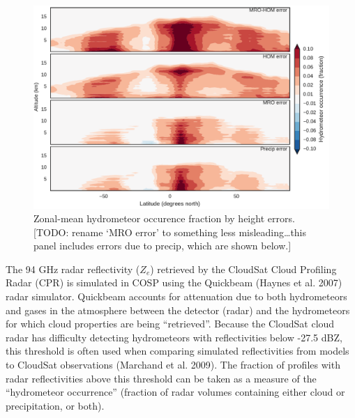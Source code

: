 \begin{figure}[htbp]
\centering
\includegraphics{graphics/subgrid1_hfba_zonal_diff.pdf}
\caption{\label{fig:subgrid1_hfba_zonal_diff}Zonal-mean hydrometeor
occurence fraction by height errors. {[}TODO: rename `MRO error' to
something less misleading\ldots{}this panel includes errors due to
precip, which are shown
below.{]}}\label{fig:subgrid1ux5fhfbaux5fzonalux5fdiff}
\end{figure}

The 94 GHz radar reflectivity (\(Z_e\)) retrieved by the CloudSat Cloud
Profiling Radar (CPR) is simulated in COSP using the Quickbeam (Haynes
et al. 2007) radar simulator. Quickbeam accounts for attenuation due to
both hydrometeors and gases in the atmosphere between the detector
(radar) and the hydrometeors for which cloud properties are being
``retrieved''. Because the CloudSat cloud radar has difficulty detecting
hydrometeors with reflectivities below -27.5 dBZ, this threshold is
often used when comparing simulated reflectivities from models to
CloudSat observations (Marchand et al. 2009). The fraction of profiles
with radar reflectivities above this threshold can be taken as a measure
of the ``hydrometeor occurrence'' (fraction of radar volumes containing
either cloud or precipitation, or both).

